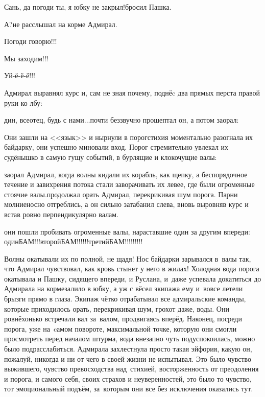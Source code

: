 \diagdash Сань, да погоди ты, я юбку не закрыл!\mdash бросил Пашка.

\diagdash А?\mdash не расслышал на корме Адмирал.

\diagdash Погоди говорю!!!

\diagdash Мы заходим!!!

\diagdash Уй-ё-ё-ё!!!

Адмирал выравнял курс и, сам не зная почему, поднёc два прямых перста правой руки ко лбу:

дин, всеотец, будь с нами$\ldots$\mdash почти беззвучно прошептал он, а потом заорал:

Они зашли на <<язык>> и нырнули в порог\mdash стихия моментально разогнала их байдарку, они успешно миновали вход. Порог стремительно увлекал их судёнышко в самую гущу событий, в бурлящие и клокочущие валы:

\mdash заорал Адмирал, когда волны кидали их корабль, как щепку, а беспорядочное течение и завихрения потока стали заворачивать их левее, где были огроменные стоячие валы.\mdash продолжал орать Адмирал, перекрикивая шум порога. Парни молниеносно отгреблись, а он сильно затабанил слева, вновь выровняв курс и встав ровно перпендикулярно валам. 

\mdash они пошли пробивать огроменные валы, нараставшие один за другим впереди: один\mdash БАМ!!!\mdash второй\mdash БАМ!!!!!!\mdash третий\mdash БАМ!!!!!!!!!

Волны окатывали их по полной, не щадя! Нос байдарки зарывался в~валы так, что Адмирал чувствовал, как кровь стынет у него в жилах! Холодная вода порога окатывала и Пашку, сидящего впереди, и Руслана, и~даже успевала докатиться до Адмирала на корме\mdash залило в юбку, а уж с вёсел экипажа ему и~вовсе летели брызги прямо в глаза. Экипаж чётко отрабатывал все адмиральские команды, которые приходилось орать, перекрикивая шум, грохот даже, воды. Они ровнёхонько встречали вал за~валом, продвигаясь вперёд. Наконец, посреди порога, уже на~cамом повороте, максимальной точке, которую они смогли просмотреть перед началом штурма, вода внезапно чуть подуспокоилась, можно было подрасслабиться. Адмирала захлестнула просто такая эйфория, какую он, пожалуй, никогда и ни от чего в своей жизни не испытывал. Это было чувство выжившего, чувство превосходства над~стихией, восторженность от преодоления и порога, и самого себя, своих страхов и неуверенностей, это было то чувство, тот эмоциональный подъём, за~которым они все без исключения оказались тут. 

